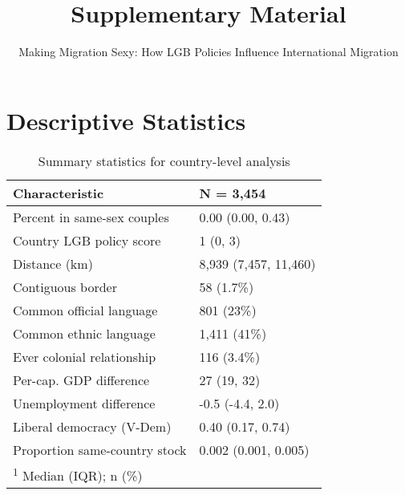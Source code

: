 \documentclass[
  11pt,
]{article}
\title{Supplementary Material}
\subtitle{Making Migration Sexy: How LGB Policies Influence International Migration}
\author{}
\date{\vspace{-2.5em}}
\begin{document}
\maketitle

{
\hypersetup{linkcolor=}
\setcounter{tocdepth}{2}
\tableofcontents
}
\hypertarget{appendix-appendix}{%
\appendix}


\hypertarget{descriptive-statistics}{%
\section{Descriptive Statistics}\label{descriptive-statistics}}

\begin{table}[!h]

\caption{\label{tab:desc-table-country}Summary statistics for country-level analysis}
\centering
\fontsize{8}{10}\selectfont
\begin{tabular}[t]{ll}
\toprule
Characteristic & N = 3,454\\
\midrule
Percent in same-sex couples & 0.00 (0.00, 0.43)\\
Country LGB policy score & 1 (0, 3)\\
Distance (km) & 8,939 (7,457, 11,460)\\
Contiguous border & 58 (1.7\%)\\
Common official language & 801 (23\%)\\
\addlinespace
Common ethnic language & 1,411 (41\%)\\
Ever colonial relationship & 116 (3.4\%)\\
Per-cap. GDP difference & 27 (19, 32)\\
Unemployment difference & -0.5 (-4.4, 2.0)\\
Liberal democracy (V-Dem) & 0.40 (0.17, 0.74)\\
\addlinespace
Proportion same-country stock & 0.002 (0.001, 0.005)\\
\bottomrule
\multicolumn{2}{l}{\rule{0pt}{1em}\textsuperscript{1} Median (IQR); n (\%)}\\
\end{tabular}
\end{table}
\end{document}
